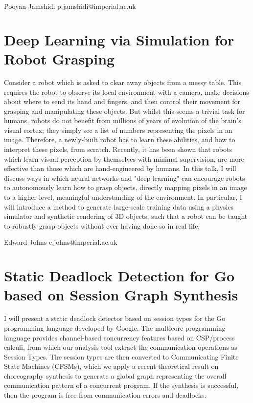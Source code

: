 \documentclass{article}
\begin{document}
Pooyan Jamshidi
p.jamshidi@imperial.ac.uk
\section*{Deep Learning via Simulation for Robot Grasping}

Consider a robot which is asked to clear away objects from a messy table. This
requires the robot to observe its local environment with a camera, make
decisions about where to send its hand and fingers, and then control their
movement for grasping and manipulating these objects. But whilst this seems a
trivial task for humans, robots do not benefit from millions of years of
evolution of the brain's visual cortex; they simply see a list of numbers
representing the pixels in an image. Therefore, a newly-built robot has to learn
these abilities, and how to interpret these pixels, from scratch. Recently, it
has been shown that robots which learn visual perception by themselves with
minimal supervision, are more effective than those which are hand-engineered by
humans. In this talk, I will discuss ways in which neural networks and "deep
learning" can encourage robots to autonomously learn how to grasp objects,
directly mapping pixels in an image to a higher-level, meaningful understanding
of the environment. In particular, I will introduce a method to generate
large-scale training data using a physics simulator and synthetic rendering of
3D objects, such that a robot can be taught to robustly grasp objects without
ever having done so in real life.

Edward Johns
e.johns@imperial.ac.uk
\section*{Static Deadlock Detection for Go based on Session Graph Synthesis}

I will present a static deadlock detector based on session types for the Go
programming language developed by Google. The multicore programming language
provides channel-based concurrency features based on CSP/process calculi, from
which our analysis tool extract the communication operations as Session Types.
The session types are then converted to Communicating Finite State Machines
(CFSMs), which we apply a recent theoretical result on choreography synthesis to
generate a global graph representing the overall communication pattern of a
concurrent program. If the synthesis is successful, then the program is free
from communication errors and deadlocks.
\end{document}
